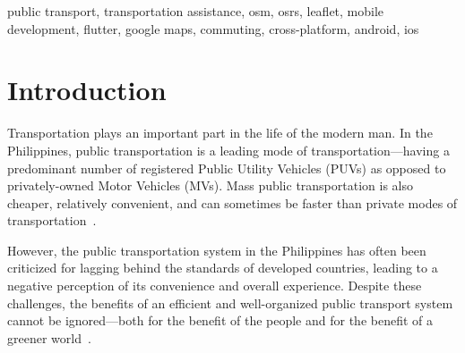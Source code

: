 \documentclass[journal]{./IEEE/IEEEtran}
\title{\SPTITLE}
\author{\ADVISEE~and~\ADVISER%
\REMARK
}
\begin{document}
\maketitle

\begin{abstract}
Public transportation is a leading mode of transportation in the Philippines, yet the public transportation system has often been criticized for lagging behind the standards of developed countries.
There is a lack of travel applications specifically tailored for public transportation assistance, and the current choices are limited and have limitations.
The goal of this paper is to develop the basis of a `commuter first' multimodal trip planning travel companion for mobile devices that commuters can use on demand and anywhere.
This is especially important for first-time commuters to an area.
Similarly, community-driven input is also important in molding a standardized transit feed dataset.
To leverage this need, the application will give users power to request the creation and modification of routes.
This project has the potential to improve the Quality of Life (QoL) of many commuters, especially those who are first time commuters to a certain place.
It can also help commuters be aware of traffic congestions and make the proper decisions in exploring other possible and more efficient routes. 
\end{abstract}

\begin{keywords}
public transport, transportation assistance, osm, osrs, leaflet, mobile development, flutter, google maps, commuting, cross-platform, android, ios
\end{keywords}

\section{Introduction}
Transportation plays an important part in the life of the modern man. In the Philippines, public transportation is a leading mode of transportation---having a predominant number of registered Public Utility Vehicles (PUVs) as opposed to privately-owned Motor Vehicles (MVs).
Mass public transportation is also cheaper, relatively convenient, and can sometimes be faster than private modes of transportation~\cite{Narboneta16}.

However, the public transportation system in the Philippines has often been criticized for lagging behind the standards of developed countries, leading to a negative perception of its convenience and overall experience. Despite these challenges, the benefits of an efficient and well-organized public transport system cannot be ignored---both for the benefit of the people and for the benefit of a greener world~\cite{Lagua19}.
\end{document}
